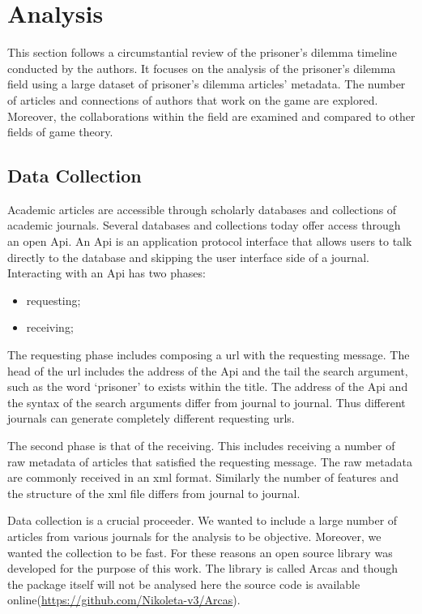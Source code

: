 \documentclass{article}
\begin{document}
\section{Analysis}\label{section:analysis}

This section follows a circumstantial review of the prisoner's dilemma timeline
conducted by the authors. It focuses on the analysis of the prisoner's dilemma
field using a large dataset of prisoner's dilemma articles' metadata.
The number of articles and connections of authors that work on the game are
explored. Moreover, the collaborations within the field are examined and compared
to other fields of game theory.

\subsection{Data Collection}

Academic articles are accessible through scholarly databases and collections of
academic journals. Several databases and collections today offer access through
an open Api. An Api is an application protocol interface that allows users to talk
directly to the database and skipping the user interface side of a journal.
Interacting with an Api has two phases:

\begin{itemize}
    \item requesting;
    \item receiving;
\end{itemize}

The requesting phase includes composing a url with the requesting message.
The head of the url includes the address of the Api and the tail the search 
argument, such as the word `prisoner' to exists within the title. The address 
of the Api and the syntax of the search arguments differ from journal to journal.
Thus different journals can generate completely different requesting urls. 

The second phase is that of the receiving. This includes receiving a number of raw
metadata of articles that satisfied the requesting message. The raw metadata are 
commonly received in an xml format. Similarly the number of features and the
structure of the xml file differs from journal to journal.

Data collection is a crucial proceeder. We wanted to include a large number of
articles from various journals for the analysis to be objective. Moreover, we 
wanted the collection to be fast. For these reasons
an open source library was developed for the purpose of this work. The library
is called Arcas and though the package itself will not be analysed here the
source code is available online(\url{https://github.com/Nikoleta-v3/Arcas}).
\end{document}
